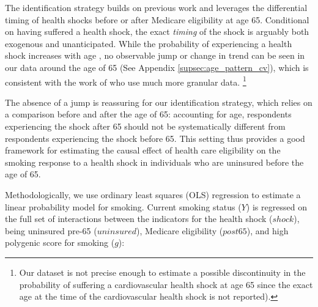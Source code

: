 \documentclass[11pt]{article}
\begin{document}
The identification strategy builds on previous work \citep{Marti2017} and leverages the differential timing of health shocks before or after Medicare eligibility at age 65.
Conditional on having suffered a health shock, the exact \textit{timing} of the shock is arguably both exogenous and unanticipated.
While the probability of experiencing a health shock increases with age \citep{Lloyd-Jones2010}, no observable jump or change in trend can be seen in our data around the age of 65 (See Appendix \ref{supsec:age_pattern_cv}), which is consistent with the work of \cite{Card2008,Card2009medicare} who use much more granular data.%
\footnote{Our dataset is not precise enough to estimate a possible discontinuity in the probability of suffering a cardiovascular health shock at age 65 since the exact age at the time of the cardiovascular health shock is not reported).}

The absence of a jump is reassuring for our identification strategy, which relies on a comparison before and after the age of 65: accounting for age, respondents experiencing the shock after 65 should not be systematically different from respondents experiencing the shock before 65.
This setting thus provides a good framework for estimating the causal effect of health care eligibility on the smoking response to a health shock in individuals who are uninsured before the age of 65.


Methodologically, we use ordinary least squares (OLS) regression to estimate a linear probability model for smoking.
Current smoking status ($Y$) is regressed on the full set of interactions between the indicators for the health shock ($shock$), being uninsured pre-65 ($uninsured$), Medicare eligibility ($post65$), and high polygenic score for smoking ($g$):
\end{document}
